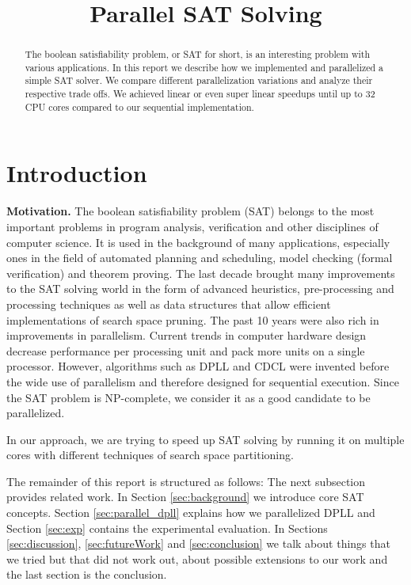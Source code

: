 \documentclass[letterpaper]{article}
\title{Parallel SAT Solving}
\newcommand{\mypar}[1]{{\bf #1.}}
\begin{document}
%
\maketitle
%

\begin{abstract}
The boolean satisfiability problem, or SAT for short, is an interesting problem with various applications.
In this report we describe how we implemented and parallelized a simple SAT solver.
We compare different parallelization variations and analyze their respective trade offs.
We achieved linear or even super linear speedups until up to 32 CPU cores compared to our sequential implementation.
\end{abstract}

\section{Introduction}\label{sec:intro}

\mypar{Motivation}
The boolean satisfiability problem (SAT) belongs to the most important problems in program analysis, verification and other disciplines of computer science.
It is used in the background of many applications, especially ones in the field of automated planning and scheduling, model checking (formal verification) and theorem proving.
The last decade brought many improvements to the SAT solving world in the form of advanced heuristics, pre-processing and processing techniques as well as data structures that allow efficient implementations of search space pruning.
The past 10 years were also rich in improvements in parallelism.
Current trends in computer hardware design decrease performance per processing unit and pack more units on a single processor.
However, algorithms such as DPLL and CDCL were invented before the wide use of parallelism and therefore designed for sequential execution.
Since the SAT problem is NP-complete, we consider it as a good candidate to be parallelized.

In our approach, we are trying to speed up SAT solving by running it on multiple cores with different techniques of search space partitioning.

The remainder of this report is structured as follows:
The next subsection provides related work.
In Section \ref{sec:background} we introduce core SAT concepts.
Section \ref{sec:parallel_dpll} explains how we parallelized DPLL and Section \ref{sec:exp} contains the experimental evaluation.
In Sections \ref{sec:discussion}, \ref{sec:futureWork} and \ref{sec:conclusion} we talk about things that we tried but that did not work out, about possible extensions to our work and the last section is the conclusion.
\end{document}
